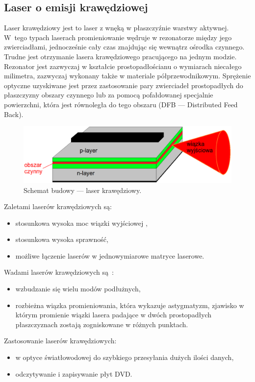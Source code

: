 \subsection{Laser o emisji krawędziowej}
Laser krawędziowy jest to laser z wnęką w płaszczyźnie warstwy aktywnej. W~tego typach laserach promieniowanie wędruje w rezonatorze między
jego zwierciadłami, jednocześnie cały czas znajdując się wewnątrz ośrodka czynnego.
Trudne jest otrzymanie lasera krawędziowego pracującego na jednym modzie.
Rezonator jest zazwyczaj w kształcie prostopadłościanu o wymiarach niecałego milimetra, zazwyczaj wykonany także w materiale półprzewodnikowym\cite{publikcja_nakwaski}.
Sprężenie optyczne uzyskiwane jest przez zastosowanie pary zwierciadeł prostopadłych do płaszczyzny obszary czynnego lub
za pomocą pofałdowanej specjalnie powierzchni, która jest równoległa do tego obszaru (DFB --- Distributed Feed Back).
\begin{figure}[H]
\center
\includegraphics[scale=0.25]{kraw2.eps}
\caption{Schemat budowy --- laser krawędziowy.}
\label{fig:teoria_rys_3}
\end{figure}
\hspace{-0.8cm}
Zaletami laserów krawędziowych są:
\begin{itemize}
\item stosunkowa wysoka moc wiązki wyjściowej \cite{publikcja_nakwaski},
\item stosunkowa wysoka sprawność,
\item możliwe łączenie laserów w jednowymiarowe matryce laserowe.
\end{itemize}
Wadami laserów krawędziowych są~\cite{publikcja_nakwaski}:
\begin{itemize}
\item wzbudzanie się wielu modów podłużnych,
\item rozbieżna wiązka promieniowania, która wykazuje astygmatyzm, zjawisko w którym promienie wiązki lasera padające w dwóch prostopadłych
płaszczyznach zostają zogniskowane w różnych punktach.
\end{itemize}
Zastosowanie laserów krawędziowych:
\begin{itemize}
\item w optyce światłowodowej do szybkiego przesyłania dużych ilości danych,
\item odczytywanie i zapisywanie płyt DVD.
\end{itemize}
\newpage
